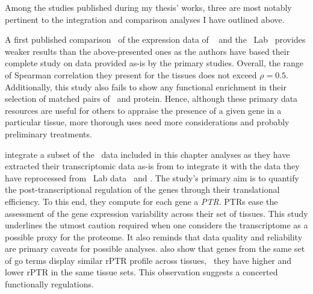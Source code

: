 Among the studies published during my thesis' works,
three are most notably pertinent to the integration and comparison analyses
I have outlined above.\mybr\

A first published comparison~ of the expression data of
\gtex\  and the \pandey\ Lab~
provides weaker results than the above-presented ones
as the authors have based their complete study on data provided as-is
by the primary studies.
Overall, the range of Spearman correlation they present for the tissues
does not exceed $\rho=0.5$.
Additionally, this study also fails to show any functional enrichment
in their selection of matched pairs of \mRNA\ and protein.
Hence, although these primary data resources are useful
for others to appraise the presence of a given gene in a particular tissue,
more thorough uses need more considerations
and probably preliminary treatments.\mybr\

\citet{Franks2017-bp} integrate a subset of the \uhlen\ data included
in this chapter analyses
as they have extracted their transcriptomic data as-is from \citet{Uhlen2014}
to integrate it with the data they have reprocessed
from \pandey\ Lab data~ and \citet{KusterData}.
The study's primary aim is
to quantify the post-transcriptional regulation of the genes
through their translational efficiency.
To this end, they compute for each gene a \emph{\gls{PTR}}.
\glspl{PTR} ease the assessment of the gene expression variability
across their set of tissues.
This study underlines the utmost caution required
when one considers the transcriptome as a possible proxy for the proteome.
It also reminds that data quality and reliability are primary caveats
for possible analyses.
\citet{Franks2017-bp} also show that genes from the same set of \gls{go} terms
display similar \gls{rPTR} profile across tissues,
\ie\ they have higher and lower \gls{rPTR} in the same tissue sets.
This observation suggests a concerted functionally regulations.\mybr\


